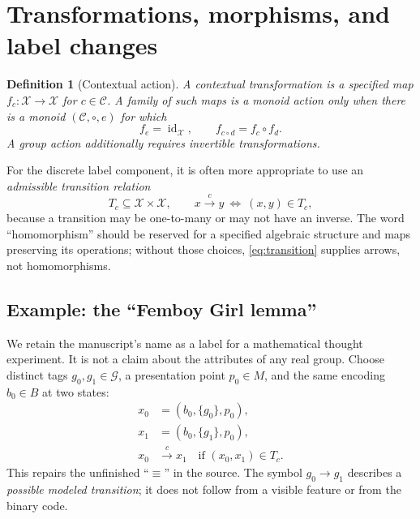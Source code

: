 \documentclass[11pt,a4paper]{article}
\numberwithin{equation}{section}
\newtheorem{definition}{Definition}[section]
\theoremstyle{remark}
\newcommand{\G}{\mathcal{G}}
\newcommand{\X}{\mathcal{X}}
\newcommand{\C}{\mathcal{C}}
\newcommand{\1}{\mathbf{1}}
\newcommand{\id}{\operatorname{id}}
\begin{document}
\section{Transformations, morphisms, and label changes}

\begin{definition}[Contextual action]
A contextual transformation is a specified map
$f_c:\X\to\X$ for $c\in\C$.  A family of such maps is a monoid action
only when there is a monoid $(\C,\circ,e)$ for which
\begin{equation}\label{eq:action}
f_e=\id_\X,\qquad f_{c\circ d}=f_c\circ f_d.
\end{equation}
A group action additionally requires invertible transformations.
\end{definition}

For the discrete label component, it is often more appropriate to use
an \emph{admissible transition relation}
\begin{equation}\label{eq:transition}
T_c\subseteq\X\times\X,\qquad x\overset{c}{\longrightarrow}y
\ \Longleftrightarrow\ (x,y)\in T_c,
\end{equation}
because a transition may be one-to-many or may not have an inverse.
The word ``homomorphism'' should be reserved for a specified algebraic
structure and maps preserving its operations; without those choices,
\eqref{eq:transition} supplies arrows, not homomorphisms.

\subsection{Example: the ``Femboy Girl lemma''}

We retain the manuscript's name as a label for a mathematical thought
experiment.  It is not a claim about the attributes of any real group.
Choose distinct tags $g_0,g_1\in\G$, a presentation point $p_0\in M$,
and the same encoding $b_0\in B$ at two states:
\begin{equation}\label{eq:fembg}
\begin{aligned}
x_0&=(b_0,\{g_0\},p_0),\\
x_1&=(b_0,\{g_1\},p_0),\\
x_0&\overset{c}{\longrightarrow}x_1
\quad\text{if }(x_0,x_1)\in T_c.
\end{aligned}
\end{equation}
This repairs the unfinished ``$\equiv$'' in the source.  The symbol
$g_0\to g_1$ describes a \emph{possible modeled transition}; it does
not follow from a visible feature or from the binary code.
\end{document}
